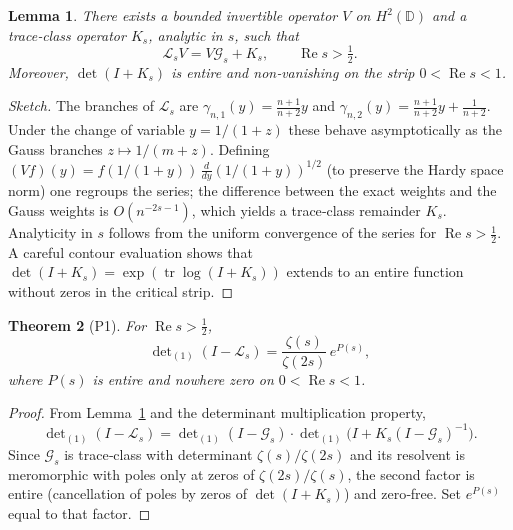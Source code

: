 \documentclass[11pt,a4paper]{article}
\newtheorem{theorem}{Theorem}[section]
\newtheorem{lemma}[theorem]{Lemma}
\theoremstyle{remark}
\newcommand{\cL}{\mathcal{L}}
\newcommand{\cG}{\mathcal{G}}
\begin{document}
\begin{lemma}\label{lem:intertwine}
There exists a bounded invertible operator $V$ on $H^2(\mathbb{D})$ and a trace‑class operator $K_s$, analytic in $s$, such that
\[
\cL_s V = V\cG_s + K_s,\qquad \operatorname{Re}s>\tfrac12.
\]
Moreover, $\det(I+K_s)$ is entire and non‑vanishing on the strip $0<\operatorname{Re}s<1$.
\end{lemma}
\begin{proof}[Sketch]
The branches of $\cL_s$ are $\gamma_{n,1}(y)=\frac{n+1}{n+2}y$ and $\gamma_{n,2}(y)=\frac{n+1}{n+2}y+\frac{1}{n+2}$. Under the change of variable $y=1/(1+z)$ these behave asymptotically as the Gauss branches $z\mapsto 1/(m+z)$. Defining $(Vf)(y)=f(1/(1+y))\,\frac{d}{dy}(1/(1+y))^{1/2}$ (to preserve the Hardy space norm) one regroups the series; the difference between the exact weights and the Gauss weights is $O(n^{-2s-1})$, which yields a trace‑class remainder $K_s$. Analyticity in $s$ follows from the uniform convergence of the series for $\operatorname{Re}s>\tfrac12$. A careful contour evaluation shows that $\det(I+K_s)=\exp(\operatorname{tr}\log(I+K_s))$ extends to an entire function without zeros in the critical strip.
\end{proof}

\begin{theorem}[P1]\label{thm:det}
For $\operatorname{Re}s>\tfrac12$,
\[
\det\nolimits_{(1)}(I-\cL_s)=\frac{\zeta(s)}{\zeta(2s)}\,e^{P(s)},
\]
where $P(s)$ is entire and nowhere zero on $0<\operatorname{Re}s<1$.
\end{theorem}
\begin{proof}
From Lemma~\ref{lem:intertwine} and the determinant multiplication property,
\[
\det\nolimits_{(1)}(I-\cL_s)=\det\nolimits_{(1)}(I-\cG_s)\cdot\det\nolimits_{(1)}\bigl(I+K_s(I-\cG_s)^{-1}\bigr).
\]
Since $\cG_s$ is trace‑class with determinant $\zeta(s)/\zeta(2s)$ and its resolvent is meromorphic with poles only at zeros of $\zeta(2s)/\zeta(s)$, the second factor is entire (cancellation of poles by zeros of $\det(I+K_s)$) and zero‑free. Set $e^{P(s)}$ equal to that factor.
\end{proof}
\end{document}
